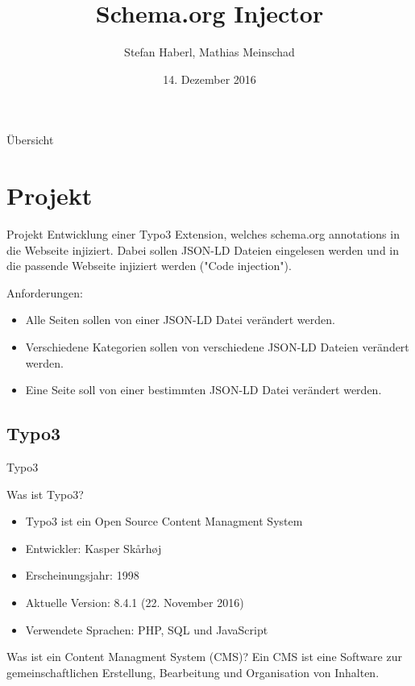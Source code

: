 \documentclass{beamer}
\title{Schema.org Injector}
\author{Stefan Haberl, Mathias Meinschad}
\institute{STI Innsbruck}
\date{14. Dezember 2016}
\begin{document}
\begin{frame}
  \titlepage
\end{frame}

\begin{frame}{Übersicht}
  \tableofcontents
\end{frame}

\section{Projekt}

\begin{frame}{Projekt}
Entwicklung einer Typo3 Extension, welches schema.org annotations in die Webseite injiziert.
Dabei sollen JSON-LD Dateien eingelesen werden und in die passende Webseite injiziert werden ("Code injection").


\begin{block}{Anforderungen:}
\begin{itemize}
\item Alle Seiten sollen von einer JSON-LD Datei verändert werden.
\item Verschiedene Kategorien sollen von verschiedene JSON-LD Dateien verändert werden.
\item Eine Seite soll von einer bestimmten JSON-LD Datei verändert werden.
\end{itemize}
\end{block}
\end{frame}


\subsection{Typo3}

\begin{frame}{Typo3}
\begin{block}{Was ist Typo3?}
\begin{itemize}
\item Typo3 ist ein Open Source Content Managment System
\item Entwickler: Kasper Skårhøj
\item Erscheinungsjahr: 1998
\item Aktuelle Version: 8.4.1 (22. November 2016)
\item Verwendete Sprachen: PHP, SQL und JavaScript
\end{itemize}
\end{block}
\begin{block}{Was ist ein Content Managment System (CMS)?}
Ein CMS ist eine Software zur gemeinschaftlichen Erstellung, Bearbeitung und Organisation von Inhalten.
\end{block}

\end{frame}
\end{document}
